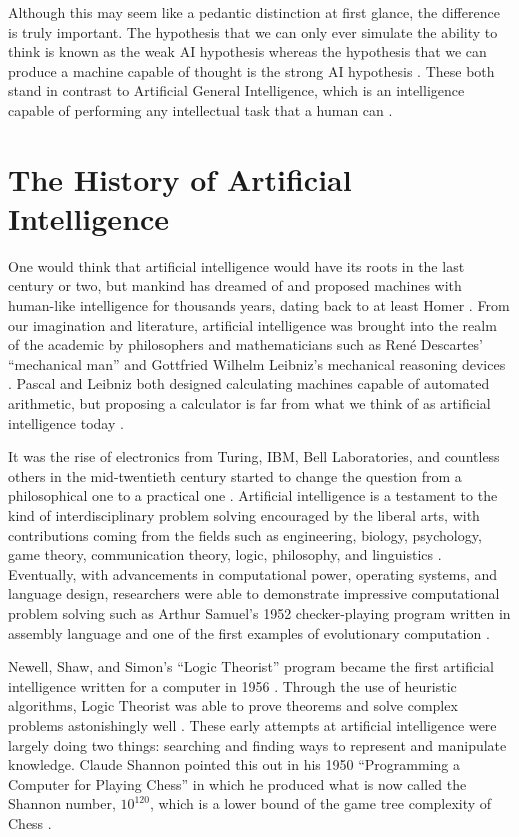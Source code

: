 \documentclass[oneside,12pt,openany]{book}
\begin{document}
	Although this may seem like a pedantic distinction at first glance, the difference is truly important. The hypothesis that we can only ever simulate the ability to think is known as the weak AI hypothesis whereas the hypothesis that we can produce a machine capable of thought is the strong AI hypothesis \cite{Jones}. These both stand in contrast to Artificial General Intelligence, which is an intelligence capable of performing any intellectual task that a human can \cite{Buchanan}.
	
	\section{The History of Artificial Intelligence}
	
	
	One would think that artificial intelligence would have its roots in the last century or two, but mankind has dreamed of and proposed machines with human-like intelligence for thousands years, dating back to at least Homer \cite{Buchanan}. From our imagination and literature, artificial intelligence was brought into the realm of the academic by philosophers and mathematicians such as Ren\'e Descartes' ``mechanical man'' and Gottfried Wilhelm Leibniz's mechanical reasoning devices \cite{Buchanan}. Pascal and Leibniz both designed calculating machines capable of automated arithmetic, but proposing a calculator is far from what we think of as artificial intelligence today  \cite{Buchanan}.
	
	It was the rise of electronics from Turing, IBM, Bell Laboratories, and countless others in the mid-twentieth century started to change the question from a philosophical one to a practical one \cite{Buchanan}. Artificial intelligence is a testament to the kind of interdisciplinary problem solving encouraged by the liberal arts, with contributions coming from the fields such as engineering, biology, psychology, game theory, communication theory, logic, philosophy, and linguistics \cite{Buchanan}. Eventually, with advancements in computational power, operating systems, and language design, researchers were able to demonstrate impressive  computational problem solving such as Arthur Samuel's 1952 checker-playing program written in assembly language and one of the first examples of evolutionary computation \cite{Buchanan}. 
	
	Newell, Shaw, and Simon's ``Logic Theorist'' program became the first artificial intelligence written for a computer in 1956 \cite{Gugerty}. Through the use of heuristic algorithms, Logic Theorist was able to prove theorems and solve complex problems astonishingly well \cite{Gugerty}. These early attempts at artificial intelligence were largely doing two things: searching and finding ways to represent and manipulate knowledge. Claude Shannon pointed this out in his 1950 ``Programming a Computer for Playing Chess'' in which he produced what is now called the Shannon number, $10^{120}$, which is a lower bound of the game tree complexity of Chess \cite{Jones}.
	
\end{document}
